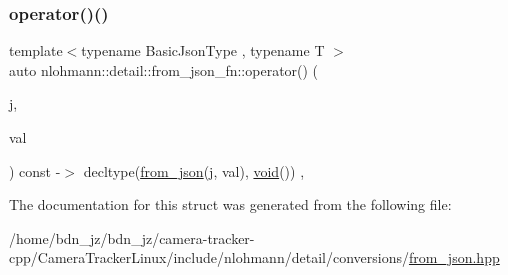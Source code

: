 \subsubsection{\texorpdfstring{operator()()}{operator()()}}
{\footnotesize\ttfamily template$<$typename Basic\+Json\+Type , typename T $>$ \\
auto nlohmann\+::detail\+::from\+\_\+json\+\_\+fn\+::operator() (\begin{DoxyParamCaption}\item[{const Basic\+Json\+Type \&}]{j,  }\item[{T \&}]{val }\end{DoxyParamCaption}) const -\/$>$ decltype(\hyperlink{namespacenlohmann_1_1detail_a1f0395aad0fe853a4539288749d3a603}{from\+\_\+json}(j, val), \hyperlink{namespacenlohmann_1_1detail_a59fca69799f6b9e366710cb9043aa77d}{void}())
    \hspace{0.3cm}{\ttfamily [inline]}, {\ttfamily [noexcept]}}



The documentation for this struct was generated from the following file\+:\begin{DoxyCompactItemize}
\item 
/home/bdn\+\_\+jz/bdn\+\_\+jz/camera-\/tracker-\/cpp/\+Camera\+Tracker\+Linux/include/nlohmann/detail/conversions/\hyperlink{from__json_8hpp}{from\+\_\+json.\+hpp}\end{DoxyCompactItemize}

